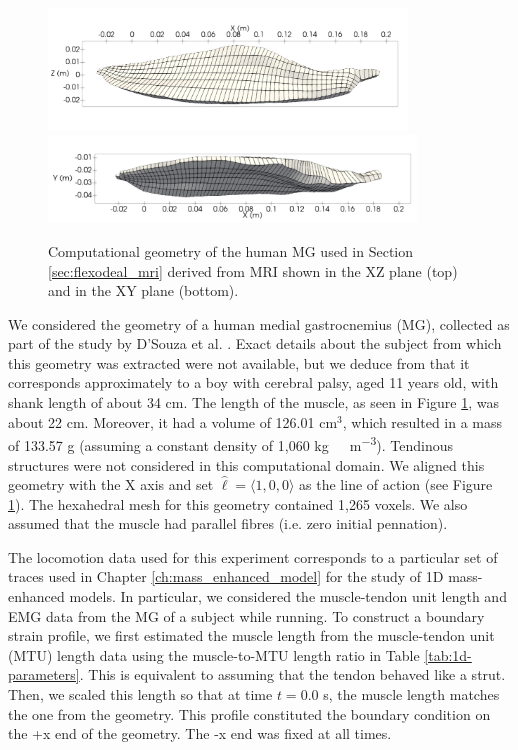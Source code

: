 \documentclass{sfuthesis}
\numberwithin{equation}{section}
\numberwithin{figure}{chapter}
\numberwithin{table}{chapter}
\theoremstyle{definition}
\begin{document}
\begin{figure}
    \centering
    \includegraphics[width=0.85\textwidth]{mri_mesh_XZ.png}\\
    \hspace*{-1.4em}\includegraphics[width=0.87\textwidth]{mri_mesh_XY.png}
    \caption{Computational geometry of the human MG used in Section \ref{sec:flexodeal_mri} derived from MRI shown in the XZ plane (top) and in the XY plane (bottom).
    \label{fig:mri_mesh}}
\end{figure}


We considered the geometry of a human medial gastrocnemius (MG), collected as part of the study by D'Souza et al. \cite{DSouza2019}. Exact details about the subject from which this geometry was extracted were not available, but we deduce from \cite{DSouza2019} that it corresponds approximately to a boy with cerebral palsy, aged 11 years old, with shank length of about 34 cm. The length of the muscle, as seen in Figure \ref{fig:mri_mesh}, was about 22 cm. Moreover, it had a volume of 126.01 cm$^3$, which resulted in a mass of 133.57 g (assuming a constant density of 1,060 \unit{kg \ m^{-3}}). Tendinous structures were not considered in this computational domain. We aligned this geometry with the X axis and set $\widehat{\bm{\ell}} = \langle 1 ,0,0 \rangle$ as the line of action (see Figure \ref{fig:mri_mesh}). The hexahedral mesh for this geometry contained 1,265 voxels. We also assumed that the muscle had parallel fibres (i.e. zero initial pennation). 

The locomotion data used for this experiment corresponds to a particular set of traces used in Chapter \ref{ch:mass_enhanced_model} for the study of 1D mass-enhanced models. In particular, we considered the muscle-tendon unit length and EMG data from the MG of a subject while running. To construct a boundary strain profile, we first estimated the muscle length from the muscle-tendon unit (MTU) length data using the muscle-to-MTU length ratio in Table \ref{tab:1d-parameters}. This is equivalent to assuming that the tendon behaved like a strut. Then, we scaled this length so that at time $t = 0.0$ s, the muscle length matches the one from the geometry. This profile constituted the boundary condition on the +x end of the geometry. The -x end was fixed at all times.
\end{document}
